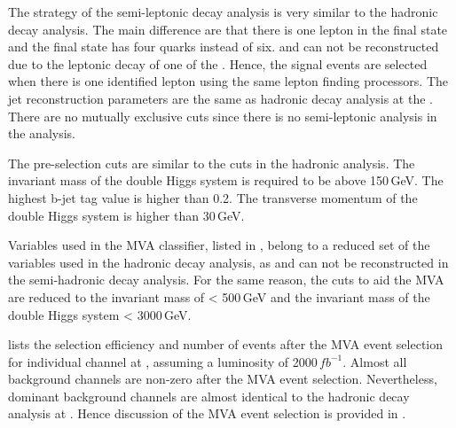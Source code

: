 The strategy of the semi-leptonic decay  analysis is very similar to the hadronic decay analysis. The main difference are that there is one lepton in the final state and the final state has four quarks instead of six. \Hbb and \PW can not be reconstructed due to the leptonic decay of one of the \PW. Hence, the signal events are selected when there is one identified lepton using the same lepton finding processors. The jet reconstruction parameters are the same as hadronic decay analysis at the . There are no mutually exclusive cuts since there is no semi-leptonic analysis in the \eeToHHbbbb analysis.

The pre-selection cuts are similar to the cuts in the hadronic analysis. The invariant mass of the double Higgs system is required to be above 150\,GeV. The highest b-jet tag value is higher than 0.2. The transverse momentum of the double Higgs system is higher than 30\,GeV.

Variables used in the MVA classifier, listed in  ,  belong to  a reduced set of the variables  used in the hadronic decay analysis, as \Hbb and \PW can not be reconstructed in the semi-hadronic decay analysis. For the same reason, the cuts to aid the MVA are reduced to the invariant mass of \Hbb < 500\,GeV and the invariant mass of the double Higgs system < 3000\,GeV.



 lists the  selection efficiency and number of events after the MVA event selection for individual channel at , assuming a luminosity of 2000$\,fb^{-1}$.  Almost all background channels are non-zero after the MVA event selection. Nevertheless,  dominant background channels are almost identical to the hadronic decay analysis  at . Hence discussion of the MVA event selection is provided in .

